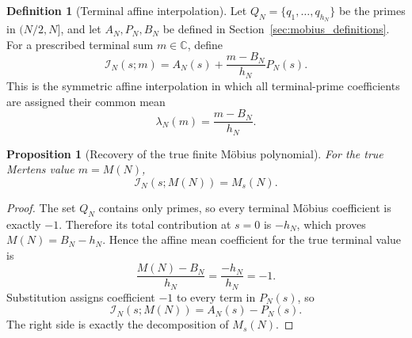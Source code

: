 \documentclass[11pt]{amsart}
\numberwithin{equation}{section}
\theoremstyle{plain}
\newtheorem{proposition}[theorem]{Proposition}
\theoremstyle{definition}
\newtheorem{definition}[theorem]{Definition}
\theoremstyle{remark}
\newcommand{\1}{\mathbf{1}}
\begin{document}
\begin{definition}[Terminal affine interpolation]
\label{def:terminal_affine_interpolation}
Let \(Q_N=\{q_1,\ldots,q_{h_N}\}\) be the primes in \((N/2,N]\), and
let \(A_N,P_N,B_N\) be defined in Section~\ref{sec:mobius_definitions}.
For a prescribed terminal sum \(m\in\mathbb C\), define
\begin{equation}
\boxed{
\mathcal I_N(s;m)
=
A_N(s)+\frac{m-B_N}{h_N}P_N(s).
}
\label{eq:terminal_affine_interpolation}
\end{equation}
This is the symmetric affine interpolation in which all terminal-prime
coefficients are assigned their common mean
\begin{equation}
\lambda_N(m)=\frac{m-B_N}{h_N}.
\label{eq:terminal_mean_coefficient}
\end{equation}
\end{definition}

\begin{proposition}[Recovery of the true finite Möbius polynomial]
\label{prop:true_terminal_value}
For the true Mertens value \(m=M(N)\),
\begin{equation}
\mathcal I_N(s;M(N))
=
M_s(N).
\label{eq:true_terminal_interpolation}
\end{equation}
\end{proposition}

\begin{proof}
The set \(Q_N\) contains only primes, so every terminal Möbius coefficient
is exactly \(-1\).  Therefore its total contribution at \(s=0\) is
\(-h_N\), which proves \(M(N)=B_N-h_N\).  Hence the affine mean coefficient
for the true terminal value is
\begin{equation}
\frac{M(N)-B_N}{h_N}
=
\frac{-h_N}{h_N}
=-1.
\label{eq:true_terminal_mean_proof_detailed}
\end{equation}
Substitution assigns coefficient \(-1\) to every term in \(P_N(s)\), so
\begin{equation}
\mathcal I_N(s;M(N))
=
A_N(s)-P_N(s).
\label{eq:true_terminal_interpolation_proof_detailed}
\end{equation}
The right side is exactly the decomposition of \(M_s(N)\).
\end{proof}
\end{document}

